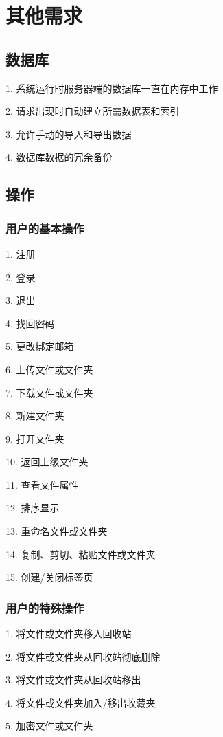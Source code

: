 \chapter{其他需求}

\section{数据库}
    
    1. 系统运行时服务器端的数据库一直在内存中工作

    2. 请求出现时自动建立所需数据表和索引

    3. 允许手动的导入和导出数据

    4. 数据库数据的冗余备份
\section{操作}
\subsection{用户的基本操作}

    1. 注册

    2. 登录

    3. 退出

    4. 找回密码

    5. 更改绑定邮箱

    6. 上传文件或文件夹

    7. 下载文件或文件夹

    8. 新建文件夹

    9. 打开文件夹

    10. 返回上级文件夹

    11. 查看文件属性

    12. 排序显示

    13. 重命名文件或文件夹

    14. 复制、剪切、粘贴文件或文件夹

    15. 创建/关闭标签页
\subsection{用户的特殊操作}

    1. 将文件或文件夹移入回收站

    2. 将文件或文件夹从回收站彻底删除

    3. 将文件或文件夹从回收站移出

    4. 将文件或文件夹加入/移出收藏夹

    5. 加密文件或文件夹
    
